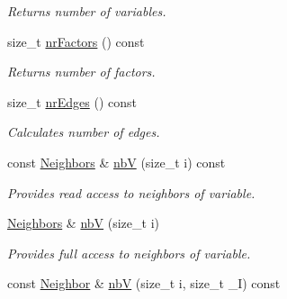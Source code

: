 \begin{CompactItemize}
\begin{CompactList}\small\item\em Returns number of variables. \item\end{CompactList}\item 
\hypertarget{classdai_1_1FactorGraph_de52f40e90ae438c985f9568811654a9}{
size\_\-t \hyperlink{classdai_1_1FactorGraph_de52f40e90ae438c985f9568811654a9}{nrFactors} () const }
\label{classdai_1_1FactorGraph_de52f40e90ae438c985f9568811654a9}

\begin{CompactList}\small\item\em Returns number of factors. \item\end{CompactList}\item 
\hypertarget{classdai_1_1FactorGraph_a1b94e2729ef0a941f6dbee1b7ea1b24}{
size\_\-t \hyperlink{classdai_1_1FactorGraph_a1b94e2729ef0a941f6dbee1b7ea1b24}{nrEdges} () const }
\label{classdai_1_1FactorGraph_a1b94e2729ef0a941f6dbee1b7ea1b24}

\begin{CompactList}\small\item\em Calculates number of edges. \item\end{CompactList}\item 
\hypertarget{classdai_1_1FactorGraph_dce52503905082b5288da10147358d03}{
const \hyperlink{classdai_1_1FactorGraph_326942db90fe2dbdf99041d5d966019e}{Neighbors} \& \hyperlink{classdai_1_1FactorGraph_dce52503905082b5288da10147358d03}{nbV} (size\_\-t i) const }
\label{classdai_1_1FactorGraph_dce52503905082b5288da10147358d03}

\begin{CompactList}\small\item\em Provides read access to neighbors of variable. \item\end{CompactList}\item 
\hypertarget{classdai_1_1FactorGraph_1b69b08da98de54b911cb8c1245d3622}{
\hyperlink{classdai_1_1FactorGraph_326942db90fe2dbdf99041d5d966019e}{Neighbors} \& \hyperlink{classdai_1_1FactorGraph_1b69b08da98de54b911cb8c1245d3622}{nbV} (size\_\-t i)}
\label{classdai_1_1FactorGraph_1b69b08da98de54b911cb8c1245d3622}

\begin{CompactList}\small\item\em Provides full access to neighbors of variable. \item\end{CompactList}\item 
\hypertarget{classdai_1_1FactorGraph_cffe2211b3a588c92cdabe40071f0c77}{
const \hyperlink{structdai_1_1BipartiteGraph_1_1Neighbor}{Neighbor} \& \hyperlink{classdai_1_1FactorGraph_cffe2211b3a588c92cdabe40071f0c77}{nbV} (size\_\-t i, size\_\-t \_\-I) const }
\label{classdai_1_1FactorGraph_cffe2211b3a588c92cdabe40071f0c77}


\end{CompactItemize}
